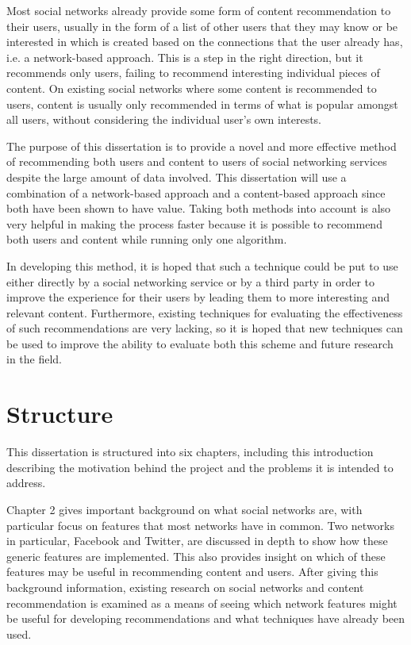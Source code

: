 Most social networks already provide some form of content recommendation to their users, usually in the form of a list of other users that they may know or be interested in which is created based on the connections that the user already has, i.e. a network-based approach. This is a step in the right direction, but it recommends only users, failing to recommend interesting individual pieces of content. On existing social networks where some content is recommended to users, content is usually only recommended in terms of what is popular amongst all users, without considering the individual user's own interests.

The purpose of this dissertation is to provide a novel and more effective method of recommending both users and content to users of social networking services despite the large amount of data involved. This dissertation will use a combination of a network-based approach and a content-based approach since both have been shown to have value. Taking both methods into account is also very helpful in making the process faster because it is possible to recommend both users and content while running only one algorithm.

In developing this method, it is hoped that such a technique could be put to use either directly by a social networking service or by a third party in order to improve the experience for their users by leading them to more interesting and relevant content. Furthermore, existing techniques for evaluating the effectiveness of such recommendations are very lacking, so it is hoped that new techniques can be used to improve the ability to evaluate both this scheme and future research in the field.

\section{Structure}

This dissertation is structured into six chapters, including this introduction describing the motivation behind the project and the problems it is intended to address.

Chapter 2 gives important background on what social networks are, with particular focus on features that most networks have in common. Two networks in particular, Facebook and Twitter, are discussed in depth to show how these generic features are implemented. This also provides insight on which of these features may be useful in recommending content and users. After giving this background information, existing research on social networks and content recommendation is examined as a means of seeing which network features might be useful for developing recommendations and what techniques have already been used.

